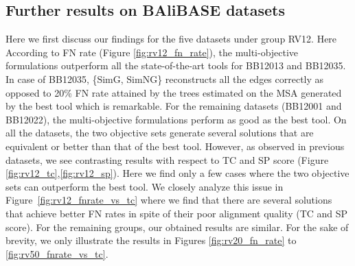 \subsection{Further results on BAliBASE datasets}
Here we first discuss our findings for the five datasets under group RV12. Here According to FN rate (Figure \ref{fig:rv12_fn_rate}), the multi-objective formulations outperform all the state-of-the-art tools for BB12013 and BB12035. In case of BB12035, \{SimG, SimNG\} reconstructs all the edges correctly as opposed to 20\% FN rate attained by the trees estimated on the MSA generated by the best tool which is remarkable.
For the remaining datasets (BB12001 and BB12022), the multi-objective formulations perform as good as the best tool. On all the datasets, the two objective sets generate several solutions that are equivalent or better than that of the best tool.
However, as observed in previous datasets, we see contrasting results with respect to TC and SP score (Figure \ref{fig:rv12_tc},\ref{fig:rv12_sp}). Here we find only a few cases where the two objective sets can outperform the best tool. We closely analyze this issue in Figure~\ref{fig:rv12_fnrate_vs_tc} where we find that there are several solutions that achieve better FN rates in spite of their poor alignment quality (TC and SP score). For the remaining groups, our obtained results are similar. For the sake of brevity, we only illustrate the results in Figures \ref{fig:rv20_fn_rate} to \ref{fig:rv50_fnrate_vs_tc}.
